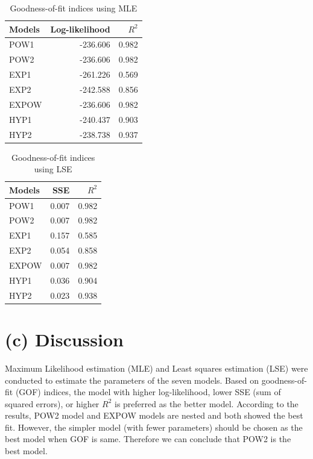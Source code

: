 \documentclass[
]{article}
\begin{document}
\begin{table}[H]
\centering
\caption{\label{tab:table-mle-gof}Goodness-of-fit indices using MLE}
\centering
\begin{tabular}[t]{lrr}
\toprule
Models & Log-likelihood & $R^2$\\
\midrule
POW1 & -236.606 & 0.982\\
POW2 & -236.606 & 0.982\\
EXP1 & -261.226 & 0.569\\
EXP2 & -242.588 & 0.856\\
EXPOW & -236.606 & 0.982\\
HYP1 & -240.437 & 0.903\\
HYP2 & -238.738 & 0.937\\
\bottomrule
\end{tabular}
\end{table}

\begin{table}[H]
\centering
\caption{\label{tab:table-lse-gof}Goodness-of-fit indices using LSE}
\centering
\begin{tabular}[t]{lrr}
\toprule
Models & SSE & $R^2$\\
\midrule
POW1 & 0.007 & 0.982\\
POW2 & 0.007 & 0.982\\
EXP1 & 0.157 & 0.585\\
EXP2 & 0.054 & 0.858\\
EXPOW & 0.007 & 0.982\\
HYP1 & 0.036 & 0.904\\
HYP2 & 0.023 & 0.938\\
\bottomrule
\end{tabular}
\end{table}

\pagebreak

\section{(c) Discussion}\label{c-discussion}

Maximum Likelihood estimation (MLE) and Least squares estimation (LSE)
were conducted to estimate the parameters of the seven models. Based on
goodness-of-fit (GOF) indices, the model with higher log-likelihood,
lower SSE (sum of squared errors), or higher \(R^2\) is preferred as the
better model. According to the results, POW2 model and EXPOW models are
nested and both showed the best fit. However, the simpler model (with
fewer parameters) should be chosen as the best model when GOF is same.
Therefore we can conclude that POW2 is the best model.
\end{document}
